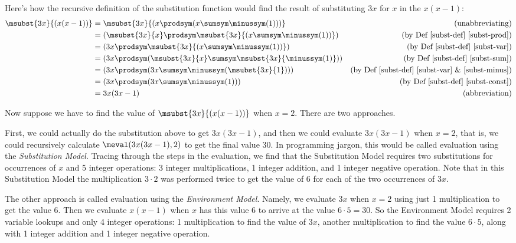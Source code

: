 \begin{definition}
\begin{definition}
\begin{itemize}
\begin{enumerate}
\end{enumerate}
\end{itemize}
\end{definition}

Here's how the recursive definition of the substitution function would find
the result of substituting $3x$ for $x$ in the $x(x-1)$:
\begin{align*}
\msubst{3x}{(x(x-1))} & =
\msubst{3x}{(x \prodsym (x \sumsym \minussym(1)))} & \text{(unabbreviating)}\\
 & = (\msubst{3x}{x} \prodsym \msubst{3x}{(x \sumsym \minussym(1))})
         & \text{(by~Def~\ref{subst-def}~\ref{subst-prod})}\\
 & = (3x \prodsym \msubst{3x}{(x \sumsym \minussym(1))})
         & \text{(by~Def~\ref{subst-def}~\ref{subst-var})}\\
 & = (3x \prodsym (\msubst{3x}{x} \sumsym \msubst{3x}{\minussym(1)}))
         & \text{(by~Def~\ref{subst-def}~\ref{subst-sum})}\\
 & = (3x \prodsym (3x \sumsym \minussym (\msubst{3x}{1})))
         & \text{(by~Def~\ref{subst-def}~\ref{subst-var} \&~\ref{subst-minus})}\\
 & = (3x \prodsym (3x \sumsym \minussym (1)))
         & \text{(by~Def~\ref{subst-def}~\ref{subst-const})}\\
 & = 3x(3x-1) & \text{(abbreviation)}
\end{align*}

Now suppose we have to find the value of $\msubst{3x}{(x(x-1))}$ when $x =
2$.  There are two approaches.

First, we could actually do the substitution above to get $3x(3x-1)$, and
then we could evaluate $3x(3x-1)$ when $x =2$, that is, we could
recursively calculate $\meval(3x(3x-1),2)$ to get the final value 30.  In
programming jargon, this would be called evaluation using the
\emph{Substitution Model}.  Tracing through the steps in the evaluation,
we find that the Substitution Model requires two substitutions for
occurrences of $x$ and 5 integer operations: 3 integer multiplications, 1
integer addition, and 1 integer negative operation.  Note that in this
Substitution Model the multiplication $3 \cdot 2$ was performed twice to
get the value of 6 for each of the two occurrences of $3x$.

The other approach is called evaluation using the \emph{Environment
  Model}.  Namely, we evaluate $3x$ when $x = 2$ using just 1
multiplication to get the value 6.  Then we evaluate $x(x-1)$ when $x$ has
this value 6 to arrive at the value $6\cdot 5=30$.  So the Environment
Model requires 2 variable lookups and only 4 integer operations: 1
multiplication to find the value of $3x$, another multiplication to find
the value $6 \cdot 5$, along with 1 integer addition and 1 integer
negative operation.


\end{definition}
